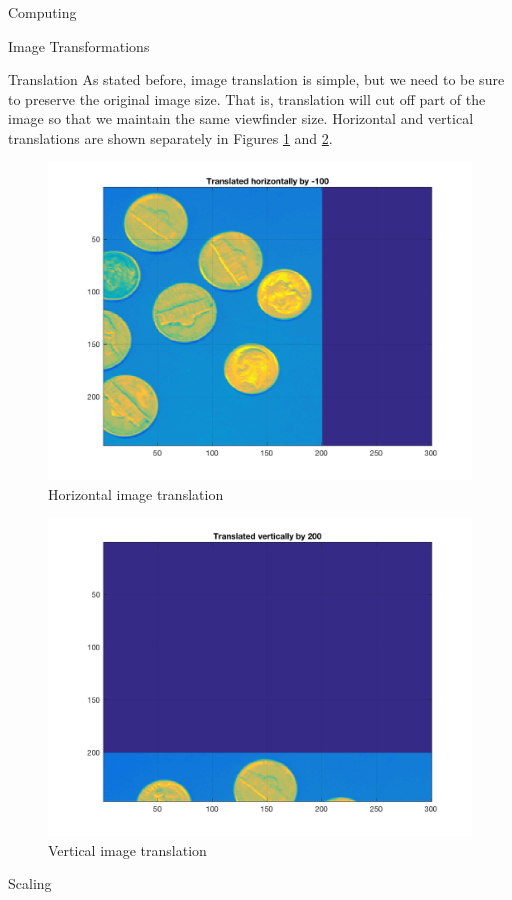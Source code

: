 \begin{section}{Computing}
\begin{homeworkSection}{Image Transformations}
\begin{subsubsection}{Translation}
As stated before, image translation is simple, but we need to be sure to preserve the original image size. That is, translation will cut off part of the image so that we maintain the same viewfinder size. Horizontal and vertical translations are shown separately in Figures \ref{fig:horiz} and \ref{fig:vert}.

\begin{figure}[H]
\centering
\includegraphics[width=0.75\columnwidth]{../data/horiz} %
\caption{Horizontal image translation}
\label{fig:horiz}
\end{figure}

\begin{figure}[H]
\centering
\includegraphics[width=0.75\columnwidth]{../data/vert} %
\caption{Vertical image translation}
\label{fig:vert}
\end{figure}

\end{subsubsection}


\begin{subsubsection}{Scaling}


\end{subsubsection}
\end{homeworkSection}
\end{section}
